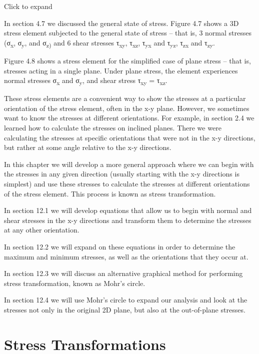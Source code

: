 \documentclass[
  letterpaper,
  DIV=11,
  numbers=noendperiod]{scrreprt}
\begin{document}

Click to expand

In section 4.7 we discussed the general state of stress. Figure 4.7
shows a 3D stress element subjected to the general state of stress --
that is, 3 normal stresses (σ\textsubscript{x}, σ\textsubscript{y}, and
σ\textsubscript{z)} and 6 shear stresses τ\textsubscript{xy},
τ\textsubscript{xz}, τ\textsubscript{yx} and τ\textsubscript{yz},
τ\textsubscript{zx} and τ\textsubscript{zy}.

Figure 4.8 shows a stress element for the simplified case of plane
stress -- that is, stresses acting in a single plane. Under plane
stress, the element experiences normal stresses σ\textsubscript{x} and
σ\textsubscript{y}, and shear stress τ\textsubscript{xy} =
τ\textsubscript{xz}.

These stress elements are a convenient way to show the stresses at a
particular orientation of the stress element, often in the x-y plane.
However, we sometimes want to know the stresses at different
orientations. For example, in section 2.4 we learned how to calculate
the stresses on inclined planes. There we were calculating the stresses
at specific orientations that were not in the x-y directions, but rather
at some angle relative to the x-y directions.

In this chapter we will develop a more general approach where we can
begin with the stresses in any given direction (usually starting with
the x-y directions is simplest) and use these stresses to calculate the
stresses at different orientations of the stress element. This process
is known as stress transformation.

In section 12.1 we will develop equations that allow us to begin with
normal and shear stresses in the x-y directions and transform them to
determine the stresses at any other orientation.

In section 12.2 we will expand on these equations in order to determine
the maximum and minimum stresses, as well as the orientations that they
occur at.

In section 12.3 we will discuss an alternative graphical method for
performing stress transformation, known as Mohr's circle.

In section 12.4 we will use Mohr's circle to expand our analysis and
look at the stresses not only in the original 2D plane, but also at the
out-of-plane stresses.

\section{Stress Transformations}\label{stress-transformations}
\end{document}
